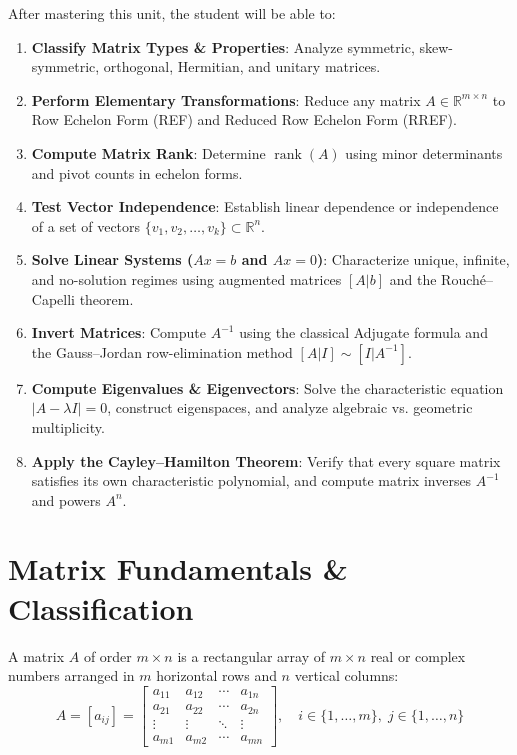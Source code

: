 \begin{important}
After mastering this unit, the student will be able to:
\begin{enumerate}[leftmargin=1.5em]
    \item \textbf{Classify Matrix Types \& Properties}: Analyze symmetric, skew-symmetric, orthogonal, Hermitian, and unitary matrices.
    \item \textbf{Perform Elementary Transformations}: Reduce any matrix $A \in \mathbb{R}^{m\times n}$ to Row Echelon Form (REF) and Reduced Row Echelon Form (RREF).
    \item \textbf{Compute Matrix Rank}: Determine $\operatorname{rank}(A)$ using minor determinants and pivot counts in echelon forms.
    \item \textbf{Test Vector Independence}: Establish linear dependence or independence of a set of vectors $\{v_1, v_2, \dots, v_k\} \subset \mathbb{R}^n$.
    \item \textbf{Solve Linear Systems ($Ax=b$ and $Ax=0$)}: Characterize unique, infinite, and no-solution regimes using augmented matrices $[A|b]$ and the Rouch\'e--Capelli theorem.
    \item \textbf{Invert Matrices}: Compute $A^{-1}$ using the classical Adjugate formula and the Gauss--Jordan row-elimination method $[A | I] \sim [I | A^{-1}]$.
    \item \textbf{Compute Eigenvalues \& Eigenvectors}: Solve the characteristic equation $|A - \lambda I| = 0$, construct eigenspaces, and analyze algebraic vs. geometric multiplicity.
    \item \textbf{Apply the Cayley--Hamilton Theorem}: Verify that every square matrix satisfies its own characteristic polynomial, and compute matrix inverses $A^{-1}$ and powers $A^n$.
\end{enumerate}
\end{important}

\section{Matrix Fundamentals \& Classification}

\begin{definition}
A matrix $A$ of order $m \times n$ is a rectangular array of $m \times n$ real or complex numbers arranged in $m$ horizontal rows and $n$ vertical columns:
\begin{equation}
A = [a_{ij}] = \begin{bmatrix}
a_{11} & a_{12} & \cdots & a_{1n} \\
a_{21} & a_{22} & \cdots & a_{2n} \\
\vdots & \vdots & \ddots & \vdots \\
a_{m1} & a_{m2} & \cdots & a_{mn}
\end{bmatrix}, \quad i \in \{1,\dots,m\}, \; j \in \{1,\dots,n\}
\end{equation}
\end{definition}

